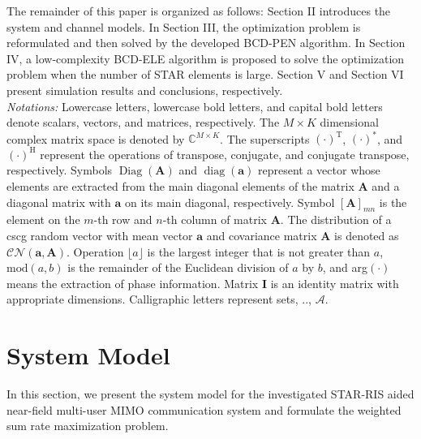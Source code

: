 \documentclass[12pt, draftclsnofoot, onecolumn]{IEEEtran}
\DeclareMathOperator{\diag}{diag}
\DeclareMathOperator{\Diag}{Diag}
\newcommand{\eg}{\text{e}.\text{g}.}
\newcommand{\cscg}{\gls{cscg}\xspace}
\begin{document}
\indent The remainder of this paper is organized as follows: Section II introduces the system and channel models. In Section III, the optimization problem is reformulated and then solved by the developed BCD-PEN algorithm. In Section IV, a low-complexity BCD-ELE algorithm is proposed to solve the optimization problem when the number of STAR elements is large. Section V and Section VI present simulation results and conclusions, respectively.\\
\indent \textit{Notations:} Lowercase letters, lowercase bold letters, and capital bold letters denote scalars, vectors, and matrices, respectively. The $M \times K$ dimensional complex matrix space is denoted by $\mathbb{C}^{M \times K}$. The superscripts $(\cdot)^\mathrm{T}$, $(\cdot)^\mathrm{*}$, and  $(\cdot)^\mathrm{H}$ represent the operations of transpose, conjugate, and conjugate transpose, respectively. Symbols $\Diag\left( \mathbf{A} \right)$ and $\diag\left( \mathbf{a} \right)$ represent a vector whose elements are extracted from the main diagonal elements of the matrix $\mathbf{A}$ and a diagonal matrix with $\mathbf{a}$ on its main diagonal, respectively. Symbol $[\mathbf{A}]_{mn}$ is the element on the $m$-th row and $n$-th column of matrix $\mathbf{A}$. The distribution of a \cscg random vector with mean vector $\mathbf{a}$ and covariance matrix $\mathbf{A}$ is denoted as $\mathcal{C N}\left(\mathbf{a}, \mathbf{A}\right)$. Operation $\lfloor a\rfloor$ is the largest integer that is not greater than $a$, $\text{mod}(a,b)$ is the remainder of the Euclidean division of $a$ by $b$, and arg$(\cdot)$ means the extraction of phase information. Matrix $\mathbf{I}$ is an identity matrix with appropriate dimensions. Calligraphic letters represent sets, \eg, $\mathcal{A}$.\vspace{-0.2cm}
\section{System Model}
In this section, we present the system model for the investigated STAR-RIS aided near-field multi-user MIMO communication system and formulate the weighted sum rate maximization problem.\vspace{-0.4cm}
\end{document}
